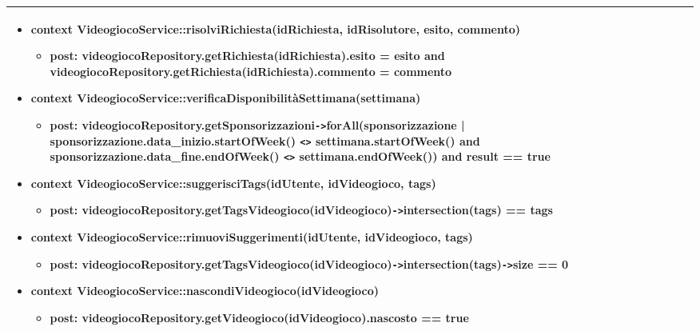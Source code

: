 \begin{tabular}{|| l | p{28em} ||}
\begin{itemize}[leftmargin=*]
		\item \textbf{context} VideogiocoService::risolviRichiesta(idRichiesta, idRisolutore, esito, commento)
		\begin{itemize}
			\item[ ] \textbf{post:} videogiocoRepository.getRichiesta(idRichiesta).esito = esito and videogiocoRepository.getRichiesta(idRichiesta).commento = commento
		\end{itemize}

		\item \textbf{context} VideogiocoService::verificaDisponibilitàSettimana(settimana)
		\begin{itemize}
			\item[ ] \textbf{post:} videogiocoRepository.getSponsorizzazioni\verb|->|forAll(sponsorizzazione | sponsorizzazione.data\_inizio.startOfWeek() \verb|<>| settimana.startOfWeek() and sponsorizzazione.data\_fine.endOfWeek() \verb|<>| settimana.endOfWeek()) and result == true
		\end{itemize}

		\item \textbf{context} VideogiocoService::suggerisciTags(idUtente, idVideogioco, tags)
		\begin{itemize}
			\item[ ] \textbf{post:} videogiocoRepository.getTagsVideogioco(idVideogioco)\verb|->|intersection(tags) == tags
		\end{itemize}

		\item \textbf{context} VideogiocoService::rimuoviSuggerimenti(idUtente, idVideogioco, tags)
		\begin{itemize}
			\item[ ] \textbf{post:} videogiocoRepository.getTagsVideogioco(idVideogioco)\verb|->|intersection(tags)\verb|->|size == 0
		\end{itemize}

		\item \textbf{context} VideogiocoService::nascondiVideogioco(idVideogioco)
		\begin{itemize}
			\item[ ] \textbf{post:} videogiocoRepository.getVideogioco(idVideogioco).nascosto == true
		\end{itemize}
	\end{itemize}\\
	\hline
\end{tabular}

\newpage
